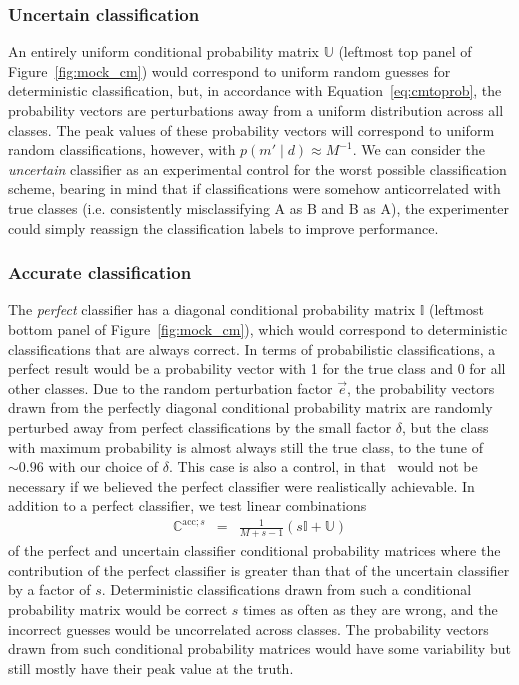 \subsubsection{Uncertain classification}
\label{sec:uncertaindata}

An entirely uniform conditional probability matrix $\mathbb{U}$ (leftmost top panel of Figure~\ref{fig:mock_cm}) would correspond to uniform random guesses for deterministic classification, but, in accordance with Equation~\ref{eq:cmtoprob}, the probability vectors are perturbations away from a uniform distribution across all classes.
The peak values of these probability vectors will correspond to uniform random classifications, however, with $p(m' \mid d)\approx M^{-1}$.
We can consider the \textit{uncertain} classifier as an experimental control for the worst possible classification scheme, bearing in mind that if classifications were somehow anticorrelated with true classes (i.e. consistently misclassifying A as B and B as A), the experimenter could simply reassign the classification labels to improve performance.

\subsubsection{Accurate classification}
\label{sec:accuratedata}

The \textit{perfect} classifier has a diagonal conditional probability matrix $\mathbb{I}$ (leftmost bottom panel of Figure~\ref{fig:mock_cm}), which would correspond to deterministic classifications that are always correct.
In terms of probabilistic classifications, a perfect result would be a probability vector with 1 for the true class and 0 for all other classes.
Due to the random perturbation factor $\vec{e}$, the probability vectors drawn from the perfectly diagonal conditional probability matrix are randomly perturbed away from perfect classifications by the small factor $\delta$, but the class with maximum probability is almost always still the true class, to the tune of $\sim0.96$ with our choice of $\delta$.
This case is also a control, in that \plasticc\ would not be necessary if we believed the perfect classifier were realistically achievable.
In addition to a perfect classifier, we test linear combinations
\begin{eqnarray}
  \label{eq:lincomb}
  \mathbb{C}^{\mathrm{acc}; s} &=& \frac{1}{M+s-1} \left(s\mathbb{I} + \mathbb{U}\right)
\end{eqnarray}
of the perfect and uncertain classifier conditional probability matrices where the contribution of the perfect classifier is greater than that of the uncertain classifier by a factor of $s$.
Deterministic classifications drawn from such a conditional probability matrix would be correct $s$ times as often as they are wrong, and the incorrect guesses would be uncorrelated across classes.
The probability vectors drawn from such conditional probability matrices would have some variability but still mostly have their peak value at the truth.

